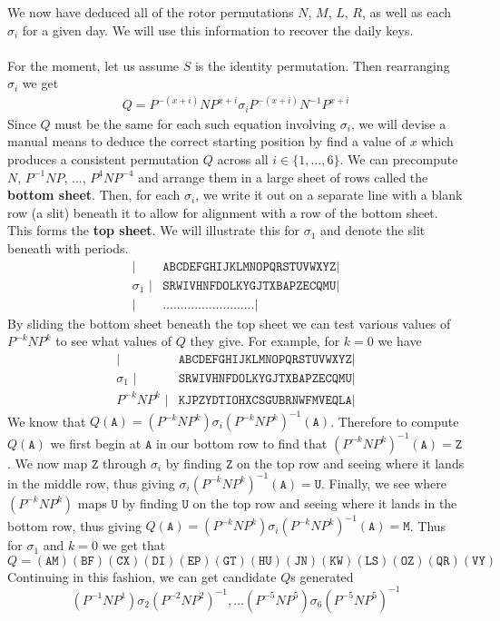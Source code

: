We now have deduced all of the rotor permutations $N$, $M$, $L$, $R$, as well as each
$\sigma_i$ for a given day. We will use this information to recover the daily keys.
\\\\For the moment, let us assume $S$ is the identity permutation. Then
rearranging $\sigma_i$ we get
\begin{align}
  Q = P^{-(x+i)}NP^{x+i}\sigma_iP^{-(x+i)}N^{-1}P^{x+i} \label{eq:q_eq}
\end{align}
Since $Q$ must be the same for each such equation involving $\sigma_i$, we will devise a manual means to deduce the correct starting position by find a value of $x$ which produces a consistent permutation $Q$ across all $i\in\{1,\dots,6\}$. We can
precompute $N$, $P^{-1}NP$, $\dots$, $P^{4}NP^{-4}$ and arrange them
in a large sheet of rows called the {\bf{bottom sheet}}. Then, for each $\sigma_i$, we write it out on a separate line with a blank row (a slit) beneath it to allow for alignment with a row of the bottom sheet. This forms the \textbf{top sheet}. We will
illustrate this for $\sigma_1$ and denote the slit beneath with periods.
\begin{align*}
  \texttt{|}          & \texttt{ABCDEFGHIJKLMNOPQRSTUVWXYZ} \texttt{|} \\
  \sigma_1\texttt{ |} & \texttt{SRWIVHNFDOLKYGJTXBAPZECQMU} \texttt{|} \\
  \texttt{|}          & \texttt{..........................} \texttt{|}
\end{align*}
By sliding the bottom sheet
beneath the top sheet we can test various values of $P^{-k}NP^{k}$ to
see what values of $Q$ they give. For example, for $k = 0$ we have
\begin{align*}
  \texttt{|}          & \texttt{ABCDEFGHIJKLMNOPQRSTUVWXYZ} \texttt{|} \\
  \sigma_1\texttt{ |} & \texttt{SRWIVHNFDOLKYGJTXBAPZECQMU} \texttt{|} \\
  P^{-k}NP^{k} \texttt{ |}       & \texttt{KJPZYDTIOHXCSGUBRNWFMVEQLA} \texttt{|}
\end{align*}
We know that $Q(\texttt{A}) =
(P^{-k}NP^k)\sigma_i(P^{-k}NP^k)^{-1}(\texttt{A})$. Therefore to compute
$Q(\texttt{A})$ we first begin at $\texttt{A}$ in our bottom row to
find that $(P^{-k}NP^k)^{-1}(\texttt{A})=\texttt{Z}$. We now map $\texttt{Z}$
through $\sigma_i$ by finding $\texttt{Z}$ on the top row and seeing
where it lands in the middle row, thus giving
$\sigma_i(P^{-k}NP^k)^{-1}(\texttt{A}) = \texttt{U}$. Finally, we see where $(P^{-k}NP^k)$
maps $\texttt{U}$ by finding $\texttt{U}$ on the top row and seeing
where it lands in the bottom row, thus giving $Q(\texttt{A}) =
(P^{-k}NP^k)\sigma_i(P^{-k}NP^k)^{-1}(\texttt{A}) = \texttt{M}$. Thus for $\sigma_1$ and $k=0$ we get that 
\[
Q = (\texttt{AM})(\texttt{BF})(\texttt{CX})(\texttt{DI})(\texttt{EP})(\texttt{GT})(\texttt{HU})(\texttt{JN})(\texttt{KW})(\texttt{LS})(\texttt{OZ})(\texttt{QR})(\texttt{VY})
\]
Continuing in this fashion, we can
get candidate $Q$s generated 
\[(P^{-1}NP^1)\sigma_2(P^{-2}NP^2)^{-1}, \dots (P^{-5}NP^5)\sigma_6(P^{-5}NP^5)^{-1}
\]
